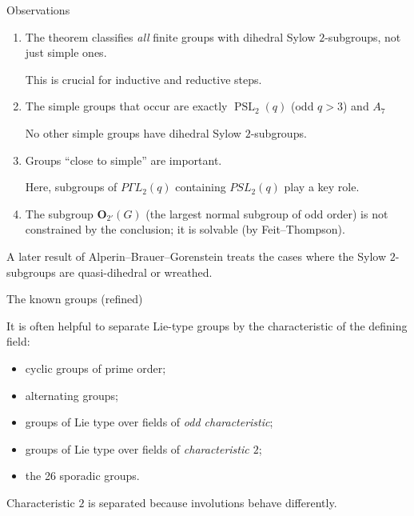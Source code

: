 \documentclass{beamer}
\DeclareMathOperator{\PSL}{PSL}
\newcommand{\Oodd}{\mathbf{O}_{2'}} %
\begin{document}
\begin{frame}{Observations}
\begin{enumerate}
  \item
  The theorem classifies \emph{all} finite groups with dihedral Sylow $2$-subgroups, not just simple ones.

  This is crucial for inductive and reductive steps.
  \item
  The simple groups that occur are exactly $\PSL_2(q)$ (odd $q>3$) and $A_7$

  No other simple groups have dihedral Sylow $2$-subgroups.
  \item
  Groups ``close to simple'' are important.

  Here, subgroups of $P\Gamma L_2(q)$ containing $PSL_2(q)$ play a key role.
  \item
  The subgroup $\Oodd(G)$ (the largest normal subgroup of odd order) is not constrained by the conclusion; it is solvable (by Feit--Thompson).
\end{enumerate}

\bigskip

A later result of Alperin--Brauer--Gorenstein treats the cases where the Sylow $2$-subgroups are quasi-dihedral or wreathed.

\end{frame}


\begin{frame}{The known groups (refined)}

It is often helpful to separate Lie-type groups by the characteristic of the defining field:
\bigskip

\begin{itemize}
  \item cyclic groups of prime order;
  \item alternating groups;
  \item groups of Lie type over fields of \emph{odd characteristic};
  \item groups of Lie type over fields of \emph{characteristic $2$};
  \item the 26 sporadic groups.
\end{itemize}

\bigskip

Characteristic $2$ is separated because involutions behave differently.
\end{frame}
\end{document}
